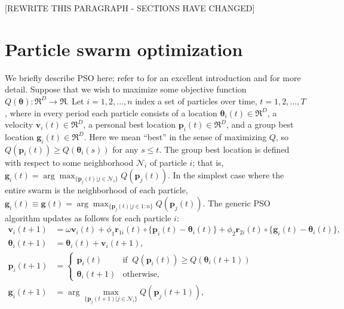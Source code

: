 \documentclass[12pt]{article}
\begin{document}
[REWRITE THIS PARAGRAPH - SECTIONS HAVE CHANGED]



\section{Particle swarm optimization}\label{sec:pso}
We briefly describe PSO here; refer to \citet{blum2008swarm} for an excellent introduction and \citet{clerc2010particle} for more detail. Suppose that we wish to maximize some objective function $Q(\bm{\theta}):\Re^D\to\Re$. Let $i=1,2,\dots,n$ index a set of particles over time, $t=1,2,\dots,T$, where in every period each particle consists of a location $\bm{\theta}_i(t)\in \Re^D$, a velocity $\bm{v}_i(t) \in \Re^D$, a personal best location $\bm{p}_i(t)\in\Re^D$, and a group best location $\bm{g}_i(t)\in\Re^D$. Here we mean ``best'' in the sense of maximizing $Q$, so $Q(\bm{p}_i(t)) \geq Q(\bm{\theta}_i(s))$ for any $s\leq t$. The group best location is defined with respect to some neighborhood $\mathcal{N}_i$ of particle $i$; that is, $\bm{g}_i(t) = \arg\max_{\{\bm{p}_j(t)|j\in\mathcal{N}_i\}}Q(\bm{p}_j(t))$. In the simplest case where the entire swarm is the neighborhood of each particle, $\bm{g}_i(t)\equiv \bm{g}(t) = \arg\max_{\{\bm{p}_j(t)|j\in 1:n\}}Q(\bm{p}_j(t))$. The generic PSO algorithm updates as follows for each particle $i$:
\begin{align}\label{eq:pso}
\bm{v}_i(t+1) &= \omega \bm{v}_i(t) + \phi_1 \bm{r}_{1i}(t)\circ\{\bm{p}_i(t) - \bm{\theta}_i(t)\} + \phi_2 \bm{r}_{2i}(t)\circ\{\bm{g}_i(t) - \bm{\theta}_i(t)\},\nonumber\\
\bm{\theta}_i(t+1) &= \bm{\theta}_i(t) + \bm{v}_i(t+1),\nonumber\\
\bm{p}_i(t+1) &= \begin{cases} \bm{p}_i(t)   & \mbox{if }\  Q(\bm{p}_i(t)) \ge Q(\bm{\theta}_i(t + 1))\\
                               \bm{\theta}_i(t+1) & \mbox{otherwise},
\end{cases}\nonumber\\
\bm{g}_i(t+1) &= \arg\max_{\{\bm{p}_j(t+1)|j\in\mathcal{N}_i\}}Q(\bm{p}_j(t+1)),
\end{align}
\end{document}
